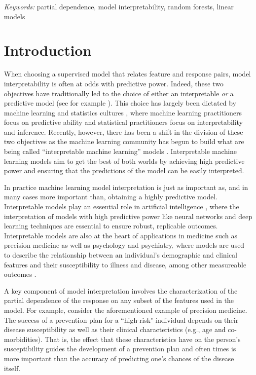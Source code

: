 \documentclass[12pt]{article}
\begin{document}
\noindent%
{\it Keywords:} partial dependence, model interpretability, random forests, linear models

\section{Introduction}
\label{sec:intro}

When choosing a supervised model that relates feature and response pairs, model interpretability is often at odds with predictive power. Indeed, these two objectives have traditionally led to the choice of either an interpretable \emph{or} a predictive model (see for example \cite{shmueli2010explain}). This choice has largely been dictated by machine learning and statistics cultures \citep{breiman2001statistical, donoho201750}, where machine learning practitioners focus on predictive ability and statistical practitioners focus on interpretability and inference. Recently, however, there has been a shift in the division of these two objectives as the machine learning community has begun to build what are being called  ``interpretable machine learning'' models \citep{doshi2017towards, vellido2012making}. Interpretable machine learning models aim to get the best of both worlds by achieving high predictive power and ensuring that the predictions of the model can be easily interpreted. 

In practice machine learning model interpretation is just as important as, and in many cases more important than, obtaining a highly predictive model. Interpretable models play an essential role in artificial intelligence \citep{adadi2018peeking}, where the interpretation of models with high predictive power like neural networks and deep learning techniques are essential to ensure robust, replicable outcomes. Interpretable models are also at the heart of applications in medicine such as precision medicine as well as psychology and psychiatry, where models are used to describe the relationship between an individual's demographic and clinical features and their susceptibility to illness and disease, among other measureable outcomes \citep{dwyer2018machine, katuwal2016machine}.

A key component of model interpretation involves the characterization of the partial dependence of the response on any subset of the features used in the model. For example, consider the aforementioned example of precision medicine. The success of a prevention plan for a ``high-risk" individual depends on their disease susceptibility as well as their clinical characteristics (e.g., age and co-morbidities). That is, the effect that these characteristics have on the person's susceptibility guides the development of a prevention plan and often times is more important than the accuracy of predicting one's chances of the disease itself. 
\end{document}
